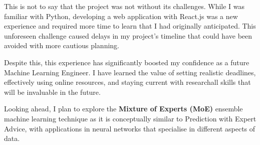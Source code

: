 This is not to say that the project was not without its challenges. While I was familiar with Python, developing a web application with React.js was a new experience and required more time to learn that I had originally anticipated. This unforeseen challenge caused delays in my project's timeline that could have been avoided with more cautious planning.

Despite this, this experience has significantly boosted my confidence as a future Machine Learning Engineer. I have learned the value of setting realistic deadlines, effectively using online resources, and staying current with research\textemdash{}all skills that will be invaluable in the future.

Looking ahead, I plan to explore the \textbf{Mixture of Experts (MoE)} ensemble machine learning technique as it is conceptually similar to Prediction with Expert Advice, with applications in neural networks that specialise in different aspects of data.